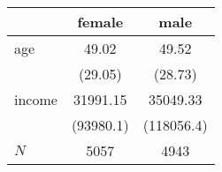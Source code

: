 {
\def\sym#1{\ifmmode^{#1}\else\(^{#1}\)\fi}
\begin{tabular}{l*{2}{c}}
\hline\hline
            &\multicolumn{1}{c}{female}&\multicolumn{1}{c}{male}\\
\hline
age         &       49.02         &       49.52         \\
            &     (29.05)         &     (28.73)         \\
[1em]
income      &    31991.15         &    35049.33         \\
            &   (93980.1)         &  (118056.4)         \\
\hline
\(N\)       &        5057         &        4943         \\
\hline\hline
\end{tabular}
}
